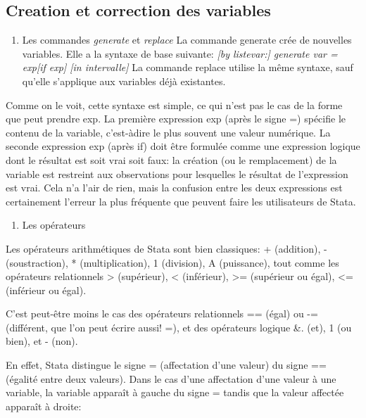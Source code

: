 \documentclass[
]{book}
\providecommand{\tightlist}{%
  \setlength{\itemsep}{0pt}\setlength{\parskip}{0pt}}
\theoremstyle{definition}
\theoremstyle{definition}
\theoremstyle{definition}
\theoremstyle{definition}
\theoremstyle{remark}
\begin{document}
\hypertarget{creation-et-correction-des-variables}{%
\subsection{Creation et correction des variables}\label{creation-et-correction-des-variables}}

\begin{enumerate}
\def\labelenumi{(\arabic{enumi})}
\tightlist
\item
  Les commandes \emph{generate} et \emph{replace}
  La commande generate crée de nouvelles variables. Elle a la syntaxe de base suivante:
  \emph{{[}by listevar:{]} generate var = exp{[}if exp{]} {[}in intervalle{]}}
  La commande replace utilise la même syntaxe, sauf qu'elle s'applique aux variables déjà existantes.
\end{enumerate}

Comme on le voit, cette syntaxe est simple, ce qui n'est pas le cas de la forme que peut prendre exp. La première expression exp (après le signe =) spécifie le contenu de la variable, c'est-àdire le plus souvent une valeur numérique. La seconde expression exp (après if) doit être formulée comme une expression logique dont le résultat est soit vrai soit faux: la création (ou le remplacement) de la variable est restreint aux observations pour lesquelles le résultat de l'expression est vrai. Cela n'a l'air de rien, mais la confusion entre les deux expressions est certainement l'erreur la plus fréquente que peuvent faire les utilisateurs de Stata.

\begin{enumerate}
\def\labelenumi{(\arabic{enumi})}
\setcounter{enumi}{1}
\tightlist
\item
  Les opérateurs
\end{enumerate}

Les opérateurs arithmétiques de Stata sont bien classiques:
+ (addition), - (soustraction), * (multiplication), 1 (division),
A (puissance), tout comme les opérateurs relationnels
\textgreater{} (supérieur), \textless{} (inférieur), \textgreater= (supérieur ou égal), \textless= (inférieur
ou égal).

C'est peut-être moins le cas des opérateurs relationnels == (égal)
ou -= (différent, que l'on peut écrire aussi! =), et des opérateurs
logique \&. (et), 1 (ou bien), et - (non).

En effet, Stata distingue le signe = (affectation d'une valeur) du
signe == (égalité entre deux valeurs). Dans le cas d'une
affectation d'une valeur à une variable, la variable apparaît à
gauche du signe = tandis que la valeur affectée apparaît à droite:
\end{document}
